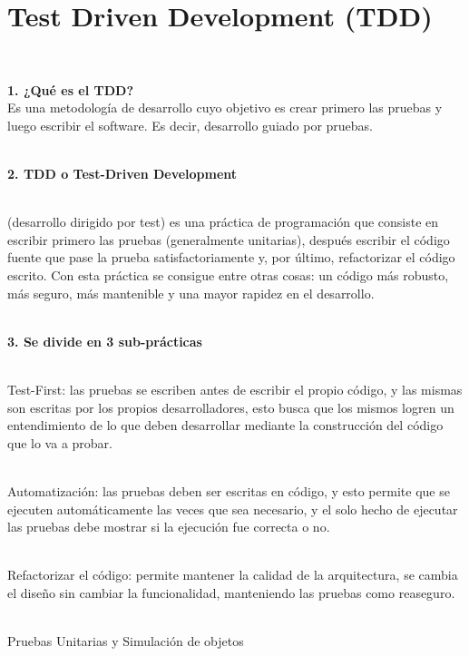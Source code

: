 \section{Test Driven Development (TDD)} 
\textbf{}\\
\begin{flushleft}
\begin{center}	
\end{center}
\begin{itemize}
\textbf{1.	¿Qué es el TDD? }
\textbf{}\\
Es una metodología de desarrollo cuyo objetivo es crear primero las pruebas y luego escribir el software. Es decir, desarrollo guiado por pruebas.

\textbf{}\\
\textbf{2.	TDD o Test-Driven Development }

\textbf{}\\
(desarrollo dirigido por test) es una práctica de programación que consiste en escribir primero las pruebas (generalmente unitarias), después escribir el código fuente que pase la prueba satisfactoriamente y, por último, refactorizar el código escrito. Con esta práctica se consigue entre otras cosas: un código más robusto, más seguro, más mantenible y una mayor rapidez en el desarrollo.

\textbf{}\\

\textbf{3.	Se divide en 3 sub-prácticas}

\textbf{}\\
Test-First: las pruebas se escriben antes de escribir el propio código, y las mismas son escritas por los propios desarrolladores, esto busca que los mismos logren un entendimiento de lo que deben desarrollar mediante la construcción del código que lo va a probar.

\textbf{}\\
Automatización: las pruebas deben ser escritas en código, y esto permite que se ejecuten automáticamente las veces que sea necesario, y el solo hecho de ejecutar las pruebas debe mostrar si la ejecución fue correcta o no.

\textbf{}\\
Refactorizar el código: permite mantener la calidad de la arquitectura, se cambia el diseño sin cambiar la funcionalidad, manteniendo las pruebas como reaseguro.

\textbf{}\\
Pruebas Unitarias y Simulación de objetos


\end{itemize}
\end{flushleft}
